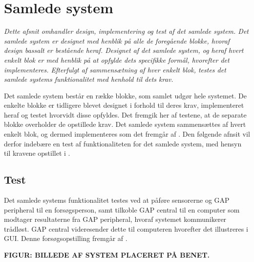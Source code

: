 \section{Samlede system}
\textit{Dette afsnit omhandler design, implementering og test af det samlede system. Det samlede system er designet med henblik på alle de foregående blokke, hvoraf design bassalt er bestående heraf. Designet af det samlede system, og heraf hvert enkelt blok er med henblik på at opfylde dets specifikke formål, hvorefter det implementeres. Efterfulgt af sammensætning af hver enkelt blok, testes det samlede systems funktionalitet med henhold til dets krav.}

Det samlede system består en række blokke, som samlet udgør hele systemet. De enkelte blokke er tidligere blevet designet i forhold til deres krav, implementeret heraf og testet hvorvidt disse opfyldes. Det fremgik her af testene, at de separate blokke overholder de opstillede krav. Det samlede system sammensættes af hvert enkelt blok, og dermed implementeres som det fremgår af . Den følgende afnsit vil derfor indebære en test af funktionaliteten for det samlede system, med hensyn til kravene opstillet i . 

\subsection{Test}
Det samlede systems funktionalitet testes ved at påføre sensorerne og GAP peripheral til en forsøgsperson, samt tilkoble GAP central til en computer som modtager resultaterne fra GAP peripheral, hvoraf systemet kommunikerer trådløst. GAP central videresender dette til computeren hvorefter det illustreres i GUI. Denne forsøgsopstilling fremgår af .

\textbf{FIGUR: BILLEDE AF SYSTEM PLACERET PÅ BENET.} \\

